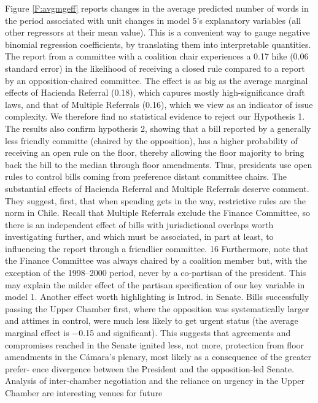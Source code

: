 \documentclass[letter,12pt]{article}
\begin{document}
Figure \ref{F:avgmgeff} reports changes in the average predicted number of words in the period associated with unit changes in model 5's explanatory variables (all other regressors at their mean value). This is a convenient way to gauge negative binomial regression coefficients, by translating them into interpretable quantities.
The report from a committee with a coalition chair experiences a 0.17
hike (0.06 standard error) in the likelihood of receiving a closed rule compared to a report by an
opposition-chaired committee. The effect is as big as the average marginal effects of Hacienda
Referral (0.18), which capures mostly high-significance draft laws, and that of Multiple Referrals
(0.16), which we view as an indicator of issue complexity. We therefore find no statistical evidence
to reject our Hypothesis 1. The results also confirm hypothesis 2, showing that a bill reported by a
generally less friendly committe (chaired by the opposition), has a higher probability of receiving
an open rule on the floor, thereby allowing the floor majority to bring back the bill to the median
through floor amendments. Thus, presidents use open rules to control bills coming from preference
distant committee chairs.
The substantial effects of Hacienda Referral and Multiple Referrals deserve comment. They
suggest, first, that when spending gets in the way, restrictive rules are the norm in Chile. Recall
that Multiple Referrals exclude the Finance Committee, so there is an independent effect of bills
with jurisdictional overlaps worth investigating further, and which must be associated, in part at
least, to influencing the report through a friendlier committee. 16 Furthermore, note that the Finance
Committee was always chaired by a coalition member but, with the exception of the 1998–2000
period, never by a co-partisan of the president. This may explain the milder effect of the partisan
specification of our key variable in model 1.
Another effect worth highlighting is Introd. in Senate. Bills successfully passing the Upper
Chamber first, where the opposition was systematically larger and attimes in control, were much
less likely to get urgent status (the average marginal effect is −0.15 and significant). This suggests
that agreements and compromises reached in the Senate ignited less, not more, protection from
floor amendments in the Cámara’s plenary, most likely as a consequence of the greater prefer-
ence divergence between the President and the opposition-led Senate. Analysis of inter-chamber
negotiation and the reliance on urgency in the Upper Chamber are interesting venues for future
\end{document}
